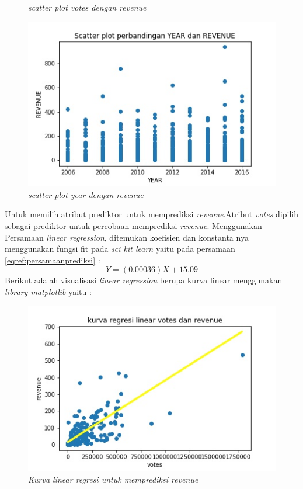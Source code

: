 \documentclass[a4paper,twoside]{article}
\begin{document}
\begin{enumerate}
\begin{figure}[h!]
		\caption{\textit{scatter plot votes dengan revenue}}
		\label{fig:scatterp-votes-revenue} 
\end{figure}
\begin{figure}[h!]
		\centering  
		\includegraphics[scale=0.7]{scatterp-YEAR-REVENUE}   
		\caption{\textit{scatter plot year dengan revenue}}
		\label{fig:scatterp-YEAR-revenue} 
\end{figure}
Untuk memilih atribut prediktor untuk memprediksi \textit{revenue}.Atribut \textit{votes} dipilih sebagai prediktor untuk percobaan memprediksi \textit{revenue}. Menggunakan Persamaan \textit{linear regression}, ditemukan koefisien dan konstanta nya menggunakan fungsi fit pada \textit{sci kit learn} yaitu pada persamaan \ref{eqref:persamaanprediksi} :  
\begin{equation}
Y = (0.00036) X +  15.09
\label{eqref:persamaanprediksi}
\end{equation}
Berikut adalah visualisasi \textit{linear regression} berupa kurva linear menggunakan \textit{library matplotlib} yaitu : 

\pagebreak
\begin{figure}[h!]
		\centering  
		\includegraphics[scale=0.9]{linearregressionplot}   
		\caption{\textit{Kurva linear regresi untuk memprediksi revenue}}
		\label{linearregressionplot} 
\end{figure}


\end{enumerate}
\end{document}
